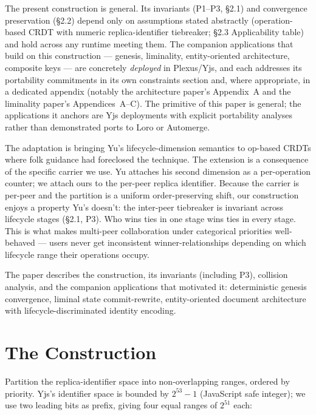 The present construction is general. Its invariants (P1--P3, §2.1) and convergence preservation (§2.2) depend only on assumptions stated abstractly (operation-based CRDT with numeric replica-identifier tiebreaker; §2.3 Applicability table) and hold across any runtime meeting them. The companion applications that build on this construction --- genesis\cite{plexus:genesis}, liminality\cite{plexus:liminal}, entity-oriented architecture\cite{plexus:arch}, composite keys\cite{plexus:keys} --- are concretely \emph{deployed} in Plexus/Yjs, and each addresses its portability commitments in its own constraints section and, where appropriate, in a dedicated appendix (notably the architecture paper's Appendix~A and the liminality paper's Appendices~A--C). The primitive of this paper is general; the applications it anchors are Yjs deployments with explicit portability analyses rather than demonstrated ports to Loro or Automerge.

The adaptation is bringing Yu's lifecycle-dimension semantics to op-based CRDTs where folk guidance had foreclosed the technique. The extension is a consequence of the specific carrier we use. Yu attaches his second dimension as a per-operation counter; we attach ours to the per-peer replica identifier. Because the carrier is per-peer and the partition is a uniform order-preserving shift, our construction enjoys a property Yu's doesn't: the inter-peer tiebreaker is invariant across lifecycle stages (§2.1, P3). Who wins ties in one stage wins ties in every stage. This is what makes multi-peer collaboration under categorical priorities well-behaved --- users never get inconsistent winner-relationships depending on which lifecycle range their operations occupy.

The paper describes the construction, its invariants (including P3), collision analysis, and the companion applications that motivated it: deterministic genesis convergence\cite{plexus:genesis}, liminal state commit-rewrite\cite{plexus:liminal}, entity-oriented document architecture with lifecycle-discriminated identity encoding\cite{plexus:arch}.

\section{The Construction}

Partition the replica-identifier space into non-overlapping ranges, ordered by priority. Yjs's identifier space is bounded by $2^{53} - 1$ (JavaScript safe integer); we use two leading bits as prefix, giving four equal ranges of $2^{51}$ each:

